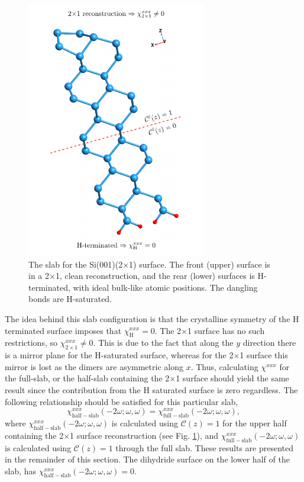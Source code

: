{\begin{figure}
\centering 
\includegraphics[width=0.7\textwidth]{content/figures/fig-4_1_01}
\caption{The slab for the Si(001)(2$\times$1) surface. The front (upper) surface
is in a 2$\times$1, clean reconstruction, and the rear (lower) surfaces is
H-terminated, with ideal bulk-like atomic positions. The dangling bonds are
H-saturated.}
\label{fig:si2x1}
\end{figure} 

The idea behind this slab configuration is that the crystalline symmetry of the
H terminated surface imposes that $\chi_{\mathrm{H}}^{xxx}=0$. The 2$\times$1
surface has no such restrictions, so $\chi_{2\times 1}^{xxx}\ne 0$. This is due
to the fact that along the $y$ direction there is a mirror plane for the
H-saturated surface, whereas for the 2$\times$1 surface this mirror is lost as
the dimers are asymmetric along $x$. Thus, calculating $\chi^{xxx}$ for the
full-slab, or the half-slab containing the 2$\times$1 surface \cite{note1}
should yield the same result since the contribution from the H saturated surface
is zero regardless. The following relationship should be satisfied for this
particular slab,
\begin{equation*}
\chi_{\mathrm{half-slab}}^{xxx}(-2\omega;\omega,\omega) =
\chi_{\mathrm{full-slab}}^{xxx}(-2\omega;\omega,\omega),
\end{equation*}
where $\chi_{\mathrm{half-slab}}^{xxx}(-2\omega;\omega,\omega)$ is calculated
using ${\mathbf{\mathcal{C}}}(z)=1$ for the upper half containing the 2$\times$1
surface reconstruction (see Fig. \ref{fig:si2x1}), and
$\chi_{\mathrm{full-slab}}^{xxx}(-2\omega;\omega,\omega)$ is calculated using
${\mathbf{\mathcal{C}}}(z)=1$ through the full slab. These results are presented
in the remainder of this section. The dihydride surface on the lower half of the
slab, has $\chi_{\mathrm{half-slab}}^{xxx}(-2\omega;\omega,\omega)=0$.

}

